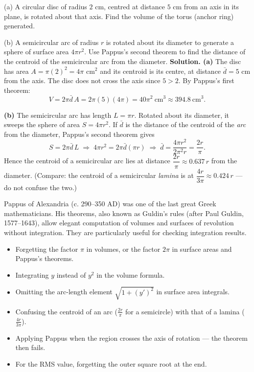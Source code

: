 \documentclass[11pt]{article}
\begin{document}
\begin{exoresolu}
(a) A circular disc of radius $2$ cm, centred at distance $5$ cm from an axis in its plane, is rotated about that axis. Find the volume of the torus (anchor ring) generated.

(b) A semicircular arc of radius $r$ is rotated about its diameter to generate a sphere of surface area $4\pi r^2$. Use Pappus's second theorem to find the distance of the centroid of the semicircular arc from the diameter.
\tcblower
\textbf{Solution. (a)} The disc has area $A=\pi(2)^2=4\pi$ cm$^2$ and its centroid is its centre, at distance $\bar d=5$ cm from the axis. The disc does not cross the axis since $5>2$. By Pappus's first theorem:
\[ V=2\pi\bar d\,A=2\pi(5)(4\pi)=40\pi^2\ \text{cm}^3\approx 394.8\ \text{cm}^3. \]

\textbf{(b)} The semicircular arc has length $L=\pi r$. Rotated about its diameter, it sweeps the sphere of area $S=4\pi r^2$. If $\bar d$ is the distance of the centroid of the \emph{arc} from the diameter, Pappus's second theorem gives
\[ S=2\pi\bar d\,L \;\Longrightarrow\; 4\pi r^2 = 2\pi\bar d(\pi r)
\;\Longrightarrow\; \bar d=\frac{4\pi r^2}{2\pi^2 r}=\frac{2r}{\pi}. \]
Hence the centroid of a semicircular arc lies at distance $\dfrac{2r}{\pi}\approx 0.637\,r$ from the diameter. (Compare: the centroid of a semicircular \emph{lamina} is at $\dfrac{4r}{3\pi}\approx 0.424\,r$ — do not confuse the two.)
\end{exoresolu}

\begin{savaistu}
Pappus of Alexandria (c. 290–350 AD) was one of the last great Greek mathematicians. His theorems, also known as Guldin's rules (after Paul Guldin, 1577–1643), allow elegant computation of volumes and surfaces of revolution without integration. They are particularly useful for checking integration results.
\end{savaistu}

\begin{attention}
\begin{itemize}
\item Forgetting the factor $\pi$ in volumes, or the factor $2\pi$ in surface areas and Pappus's theorems.
\item Integrating $y$ instead of $y^2$ in the volume formula.
\item Omitting the arc-length element $\sqrt{1+(y')^2}$ in surface area integrals.
\item Confusing the centroid of an arc ($\tfrac{2r}{\pi}$ for a semicircle) with that of a lamina ($\tfrac{4r}{3\pi}$).
\item Applying Pappus when the region crosses the axis of rotation — the theorem then fails.
\item For the RMS value, forgetting the outer square root at the end.
\end{itemize}
\end{attention}
\end{document}
